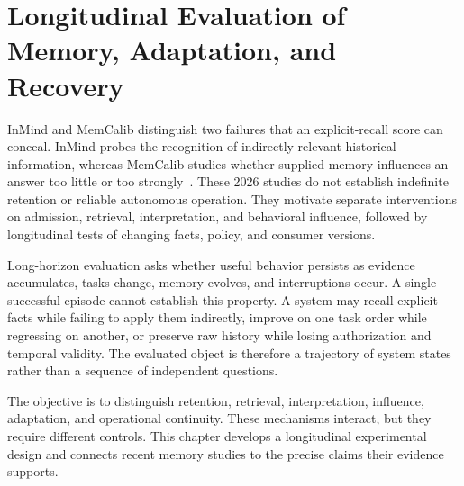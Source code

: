 \chapter{Longitudinal Evaluation of Memory, Adaptation, and Recovery}\label{ch:C27}
InMind and MemCalib distinguish two failures that an explicit-recall score can conceal. InMind probes the recognition of indirectly relevant historical information, whereas MemCalib studies whether supplied memory influences an answer too little or too strongly~\cite{inmind2026,memcalib2026}. These 2026 studies do not establish indefinite retention or reliable autonomous operation. They motivate separate interventions on admission, retrieval, interpretation, and behavioral influence, followed by longitudinal tests of changing facts, policy, and consumer versions.

Long-horizon evaluation asks whether useful behavior persists as evidence accumulates, tasks change, memory evolves, and interruptions occur. A single successful episode cannot establish this property. A system may recall explicit facts while failing to apply them indirectly, improve on one task order while regressing on another, or preserve raw history while losing authorization and temporal validity. The evaluated object is therefore a trajectory of system states rather than a sequence of independent questions.

The objective is to distinguish retention, retrieval, interpretation, influence, adaptation, and operational continuity. These mechanisms interact, but they require different controls. This chapter develops a longitudinal experimental design and connects recent memory studies to the precise claims their evidence supports.









